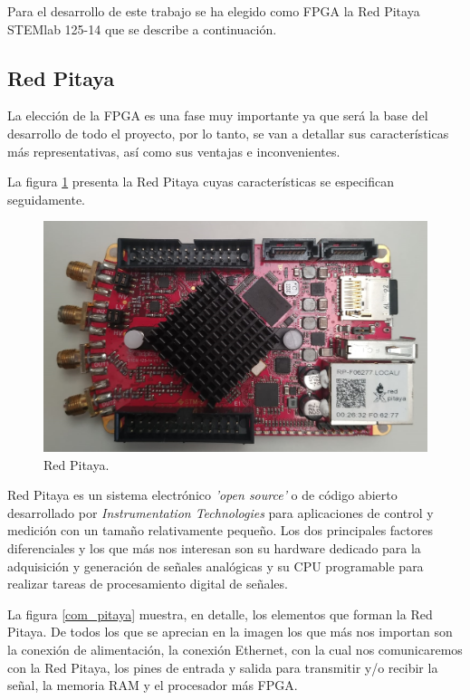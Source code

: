 Para el desarrollo de este trabajo se ha elegido como FPGA la Red Pitaya STEMlab 125-14 
que se describe a continuación.

\subsection{Red Pitaya}

La elección de la FPGA es una fase muy importante ya que será la base del 
desarrollo de todo el proyecto, por lo tanto, se van a detallar sus características 
más representativas, así como sus ventajas e inconvenientes.

La figura \ref{pitaya} presenta la Red Pitaya cuyas características se especifican 
seguidamente.

\begin{figure}[ht]
    \centering
    \includegraphics[scale=0.25]{./figuras/pitaya.png}
    \caption{\small{Red Pitaya.}}
    \label{pitaya}%
\end{figure}

Red Pitaya es un sistema electrónico \textit{'open source'} o de código abierto 
desarrollado por \textit{Instrumentation Technologies} para
aplicaciones de control y medición con un tamaño relativamente pequeño. Los dos 
principales factores diferenciales y los que más nos interesan son 
su hardware dedicado para la adquisición y generación de señales analógicas y
su CPU programable para realizar tareas de procesamiento digital
de señales. 

La figura \ref{com_pitaya} muestra, en detalle, los elementos que forman la Red Pitaya.
De todos los que se aprecian en la imagen los que más nos importan son la conexión de 
alimentación, la conexión Ethernet, con la cual nos comunicaremos con la Red Pitaya,
los pines de entrada y salida para transmitir y/o recibir la señal, la memoria RAM y
el procesador más FPGA.

